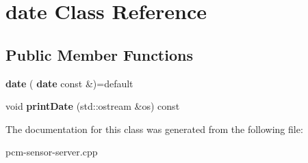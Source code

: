 \section{date Class Reference}
\label{classdate}
\subsection*{Public Member Functions}
\begin{DoxyCompactItemize}
\item 
\mbox{\label{classdate_afca9e58de4984032f88aaef34512a88f}} 
{\bfseries date} (\textbf{ date} const \&)=default
\item 
\mbox{\label{classdate_a468a83e3f024083f19a83e54b91bfa66}} 
void {\bfseries print\+Date} (std\+::ostream \&os) const
\end{DoxyCompactItemize}


The documentation for this class was generated from the following file\+:\begin{DoxyCompactItemize}
\item 
pcm-\/sensor-\/server.\+cpp\end{DoxyCompactItemize}
